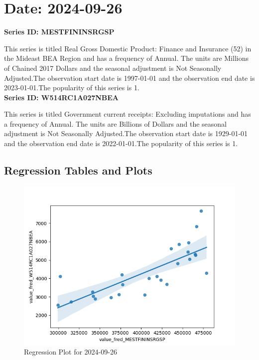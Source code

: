 \section{Date: 2024-09-26}
\noindent \textbf{Series ID: MESTFININSRGSP} 

\noindent This series is titled Real Gross Domestic Product: Finance and Insurance (52) in the Mideast BEA Region and has a frequency of Annual. The units are Millions of Chained 2017 Dollars and the seasonal adjustment is Not Seasonally Adjusted.The observation start date is 1997-01-01 and the observation end date is 2023-01-01.The popularity of this series is 1. \\ 

\noindent \textbf{Series ID: W514RC1A027NBEA} 

\noindent This series is titled Government current receipts: Excluding imputations and has a frequency of Annual. The units are Billions of Dollars and the seasonal adjustment is Not Seasonally Adjusted.The observation start date is 1929-01-01 and the observation end date is 2022-01-01.The popularity of this series is 1. \\ 

\subsection{Regression Tables and Plots}


\begin{figure}
\centering
\includegraphics[scale = 0.9]{plots/plot_2024-09-26.png}
\caption{Regression Plot for 2024-09-26}
\end{figure}
\newpage
